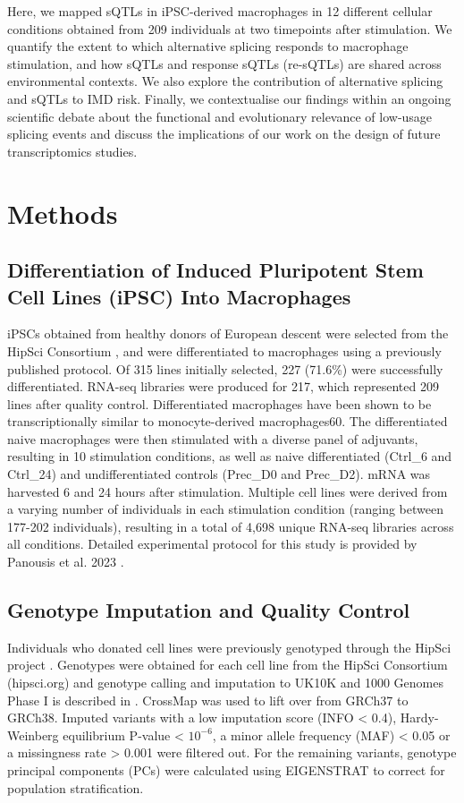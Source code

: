 Here, we mapped sQTLs in iPSC-derived macrophages in 12 different cellular conditions obtained from 209 individuals at two timepoints after stimulation. We quantify the extent to which alternative splicing responds to macrophage stimulation, and how sQTLs and response sQTLs (re-sQTLs) are shared across environmental contexts. We also explore the contribution of alternative splicing and sQTLs to IMD risk. Finally, we contextualise our findings within an ongoing scientific debate about the functional and evolutionary relevance of low-usage splicing events and discuss the implications of our work on the design of future transcriptomics studies. \\
\section{Methods}

\subsection{Differentiation of Induced Pluripotent Stem Cell Lines (iPSC) Into Macrophages}

iPSCs obtained from healthy donors of European descent were selected from the HipSci Consortium \cite{Kilpinen2017-qm}, and were differentiated to macrophages using a previously published protocol. Of 315 lines initially selected, 227 (71.6\%) were successfully differentiated. RNA-seq libraries were produced for 217, which represented 209 lines after quality control. Differentiated macrophages have been shown to be transcriptionally similar to monocyte-derived macrophages60. The differentiated naive macrophages were then stimulated with a diverse panel of adjuvants, resulting in 10 stimulation conditions, as well as naive differentiated (Ctrl\_6 and Ctrl\_24) and undifferentiated controls (Prec\_D0 and Prec\_D2). mRNA was harvested 6 and 24 hours after stimulation. Multiple cell lines were derived from a varying number of individuals in each stimulation condition (ranging between 177-202 individuals), resulting in a total of 4,698 unique RNA-seq libraries across all conditions. Detailed experimental protocol for this study is provided by Panousis et al. 2023 \cite{macromap-eqtl}.

\subsection{Genotype Imputation and Quality Control}
Individuals who donated cell lines were previously genotyped through the HipSci project \cite{Kilpinen2017-qm}. Genotypes were obtained for each cell line from the HipSci Consortium  (hipsci.org) and genotype calling and imputation to  UK10K and 1000 Genomes Phase I is described in \cite{Kilpinen2017-qm}. CrossMap \cite{Zhao2014-ve} was used to lift over from GRCh37 to GRCh38. Imputed variants with a low imputation score (INFO < 0.4), Hardy-Weinberg equilibrium P-value < $10^{-6}$, a minor allele frequency (MAF) < 0.05 or a missingness rate > 0.001 were filtered out. For the remaining variants, genotype principal components (PCs) were calculated using EIGENSTRAT \cite{Price2006-kr} to correct for population stratification.

